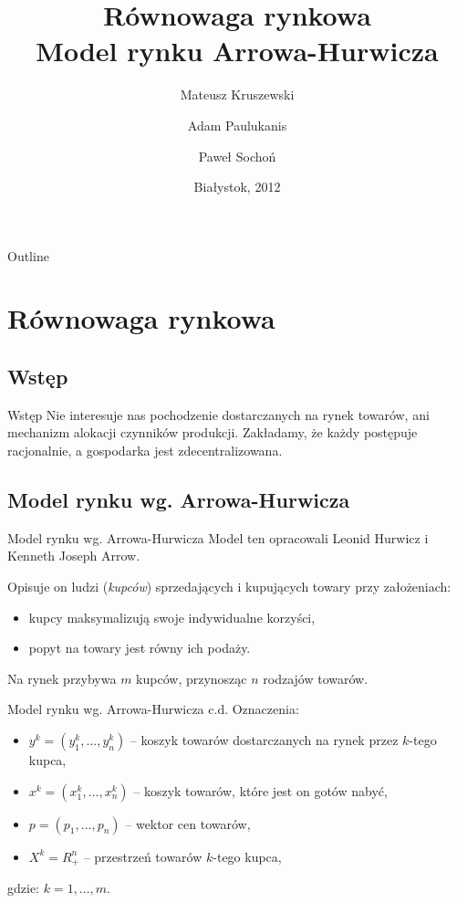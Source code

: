 \documentclass[a4paper, 11pt]{beamer}
\title[Model rynku Arrowa-Hurwicza]
{
  Równowaga rynkowa\\
  Model rynku Arrowa-Hurwicza
}
\author[Kruszewski, Paulukanis, Sochoń]
{
  Mateusz Kruszewski  \and
  Adam Paulukanis     \and
  Paweł Sochoń
}
\institute[UwB]
{
  Uniwersytet w Białymstoku
}
\date[Białystok, 2012]
{
  Białystok, 2012
}
\begin{document}
  \begin{frame}
    \titlepage
  \end{frame}

  \begin{frame}{Outline}
    \tableofcontents
  \end{frame}


  \section{Równowaga rynkowa}
    \subsection{Wstęp}

      \begin{frame}{Wstęp}
	Nie interesuje nas pochodzenie dostarczanych na rynek towarów, ani
	mechanizm alokacji czynników produkcji. Zakładamy, że każdy postępuje
	racjonalnie, a gospodarka jest zdecentralizowana. 
      \end{frame}

    \subsection{Model rynku wg. Arrowa-Hurwicza}

      \begin{frame}{Model rynku wg. Arrowa-Hurwicza}
        Model ten opracowali Leonid Hurwicz i Kenneth Joseph Arrow.

        Opisuje on ludzi (\textit{kupców}) sprzedających i kupujących towary przy
        założeniach:

	\vskip10pt
	\begin{itemize}
	  \item kupcy maksymalizują swoje indywidualne korzyści,
	  \item popyt na towary jest równy ich podaży.
	\end{itemize}

	\vskip20pt
	Na rynek przybywa $m$ kupców, przynosząc $n$ rodzajów towarów.
	
      \end{frame}

      \begin{frame}{Model rynku wg. Arrowa-Hurwicza c.d.}
	Oznaczenia:

	\begin{itemize}
	  \item $y^k=(y_1^k, \ldots, y_n^k)$ -- koszyk towarów dostarczanych na
	  rynek przez $k$-tego kupca,

	  \item $x^k=(x_1^k, \ldots, x_n^k)$ -- koszyk towarów, które jest on
	  gotów nabyć,

	  \item $p=(p_1, \ldots, p_n)$ -- wektor cen towarów,

	  \item $X^k=R_{+}^n$ -- przestrzeń towarów $k$-tego kupca,
	\end{itemize}

	gdzie: $k=1, \ldots, m$.

      \end{frame}
\end{document}
